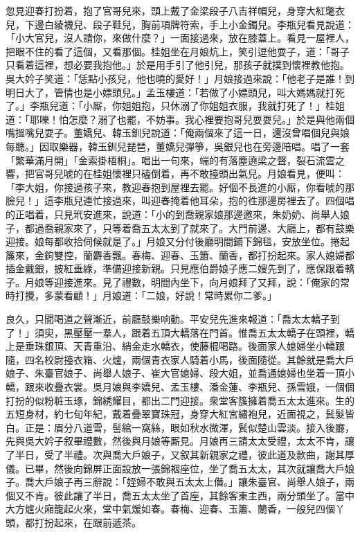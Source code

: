忽見迎春打扮着，抱了官哥兒來，頭上戴了金梁段子八吉祥帽兒，身穿大紅氅衣兒，下邊白綾襪兒、段子鞋兒，胸前項牌符索，手上小金鐲兒。李瓶兒看見說道：「小大官兒，沒人請你，來做什麼？」一面接過來，放在膝蓋上。看見一屋裡人，把眼不住的看了這個，又看那個。桂姐坐在月娘炕上，笑引逗他耍子，道：「哥子只看着這裡，想必要我抱他。」於是用手引了他引兒，那孩子就撲到懷裡教他抱。吳大妗子笑道：「恁點小孩兒，他也曉的愛好！」月娘接過來說：「他老子是誰！到明日大了，管情也是小嫖頭兒。」孟玉樓道：「若做了小嫖頭兒，叫大媽媽就打死了。」李瓶兒道：「小厮，你姐姐抱，只休溺了你姐姐衣服，我就打死了！」桂姐道：「耶嚛！怕怎麼？溺了也罷，不妨事。我心裡要抱哥兒耍耍兒。」於是與他兩個嘴搵嘴兒耍子。董嬌兒、韓玉釧兒說道：「俺兩個來了這一日，還沒曾唱個兒與娘每聽。」因取樂器，韓玉釧兒琵琶，董嬌兒彈箏，吳銀兒也在旁邊陪唱。唱了一套「繁華滿月開」「金索掛梧桐」。唱出一句來，端的有落塵遶梁之聲，裂石流雲之響，把官哥兒唬的在桂姐懷裡只磕倒着，再不敢擡頭出氣兒。月娘看見，便叫：「李大姐，你接過孩子來，教迎春抱到屋裡去罷。好個不長進的小厮，你看唬的那臉兒！」這李瓶兒連忙接過來，叫迎春掩着他耳朵，抱的徃那邊房裡去了。四個唱的正唱着，只見玳安進來，說道：「小的到喬親家娘那邊邀來，朱奶奶、尚舉人娘子，都過喬親家來了，只等着喬五太太到了就來了。大門前邊、大廳上，都有鼓樂迎接。娘每都收拾伺候就是了。」月娘又分付後廳明間鋪下錦毯，安放坐位。捲起簾來，金鉤雙控，蘭麝香飄。春梅、迎春、玉簫、蘭香，都打扮起來。家人媳婦都插金戴銀，披紅垂綠，準備迎接新親。只見應伯爵娘子應二嫂先到了，應保跟着轎子。月娘等迎接進來。見了禮數，明間內坐下，向月娘拜了又拜，說：「俺家的常時打攪，多蒙看顧！」月娘道：「二娘，好說！常時累你二爹。」

良久，只聞喝道之聲漸近，前廳鼓樂响動。平安兒先進來報道：「喬太太轎子到了！」須臾，黑壓壓一羣人，跟着五頂大轎落在門首。惟喬五太太轎子在頭裡，轎上是垂珠銀頂、天青重沿、綃金走水轎衣，使藤棍喝路。後面家人媳婦坐小轎跟隨，四名校尉擡衣箱、火爐，兩個青衣家人騎着小馬，後面隨從。其餘就是喬大戶娘子、朱臺官娘子、尚舉人娘子、崔大官媳婦、段大姐，並喬通媳婦也坐着一頂小轎，跟來收疊衣裳。吳月娘與李嬌兒、孟玉樓、潘金蓮、李瓶兒、孫雪娥，一個個打扮的似粉粧玉琢，錦綉耀目，都出二門迎接。衆堂客簇擁着喬五太太進來。生的五短身材，約七旬年紀，戴着疊翠寶珠冠，身穿大紅宮繡袍兒，近面視之，鬂髮皆白。正是：眉分八道雪，髻綰一窩絲，眼如秋水微渾，鬂似楚山雲淡。接入後廳，先與吳大妗子叙畢禮數，然後與月娘等厮見。月娘再三請太太受禮，太太不肯，讓了半日，受了半禮。次與喬大戶娘子，又叙其新親家之禮，彼此道及款曲，謝其厚儀。已畢，然後向錦屏正面設放一張錦裀座位，坐了喬五太太，其次就讓喬大戶娘子。喬大戶娘子再三辭說：「姪婦不敢與五太太上僭。」讓朱臺官、尚舉人娘子，兩個又不肯。彼此讓了半日，喬五太太坐了首座，其餘客東主西，兩分頭坐了。當中大方爐火廂籠起火來，堂中氣煖如春。春梅、迎春、玉簫、蘭香，一般兒四個丫頭，都打扮起來，在跟前遞茶。

